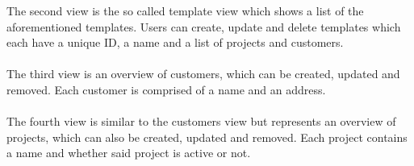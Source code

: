 The second view is the so called template view which shows a list of the aforementioned templates.
Users can create, update and delete templates which each have a unique ID, a name and a list of projects 
and customers.\paragraph{}
The third view is an overview of customers, which can be created, updated and removed. 
Each customer is comprised of a name and an address.\paragraph{}
The fourth view is similar to the customers view but represents an overview of projects, which 
can also be created, updated and removed.
Each project contains a name and whether said project is active or not.\paragraph{}
